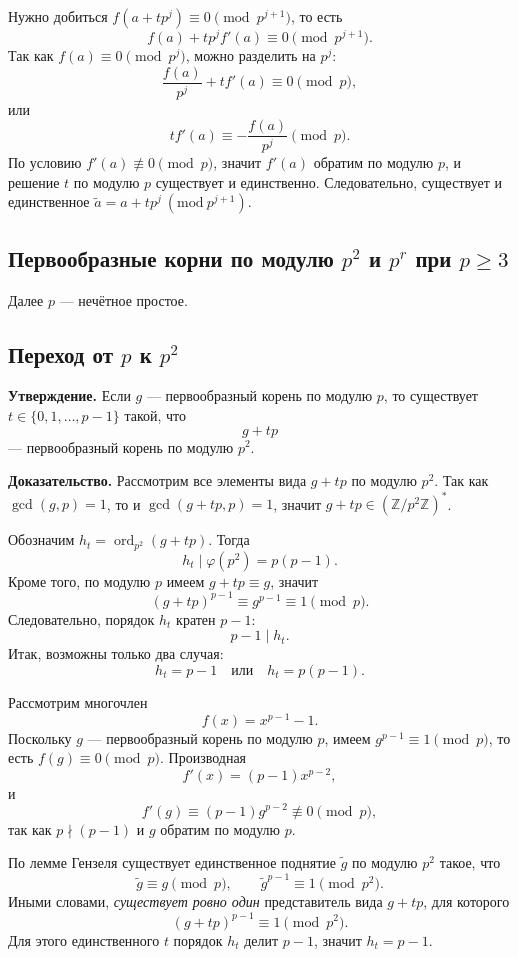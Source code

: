 \documentclass[12pt,a4paper]{article}
\newcommand{\Z}{\mathbb{Z}}
\DeclareMathOperator{\gcdop}{gcd}
\DeclareMathOperator{\ord}{ord}
\begin{document}
Нужно добиться $f(a+t p^j)\equiv 0\pmod{p^{j+1}}$, то есть
\[
f(a)+t p^j f'(a)\equiv 0\pmod{p^{j+1}}.
\]
Так как $f(a)\equiv 0\pmod{p^j}$, можно разделить на $p^j$:
\[
\frac{f(a)}{p^j}+t f'(a)\equiv 0\pmod p,
\]
или
\[
t f'(a)\equiv -\frac{f(a)}{p^j}\pmod p.
\]
По условию $f'(a)\not\equiv 0\pmod p$, значит $f'(a)$ обратим по модулю $p$, и решение $t$ по модулю $p$ существует и единственно.
Следовательно, существует и единственное $\tilde a=a+t p^j \ (\mathrm{mod}\ p^{j+1})$.

\subsection*{Первообразные корни по модулю $p^2$ и $p^r$ при $p\ge 3$}

Далее $p$ — нечётное простое.

\subsection*{Переход от $p$ к $p^2$}

\textbf{Утверждение.} Если $g$ — первообразный корень по модулю $p$, то существует $t\in\{0,1,\dots,p-1\}$ такой, что
\[
g+t p
\]
— первообразный корень по модулю $p^2$.

\textbf{Доказательство.}
Рассмотрим все элементы вида $g+t p$ по модулю $p^2$.
Так как $\gcdop(g,p)=1$, то и $\gcdop(g+t p,p)=1$, значит $g+t p\in(\Z/p^2\Z)^{\ast}$.

Обозначим $h_t=\ord_{p^2}(g+t p)$. Тогда
\[
h_t \mid \varphi(p^2)=p(p-1).
\]
Кроме того, по модулю $p$ имеем $g+t p \equiv g$, значит
\[
(g+t p)^{p-1}\equiv g^{p-1}\equiv 1\pmod p.
\]
Следовательно, порядок $h_t$ кратен $p-1$:
\[
p-1 \mid h_t.
\]
Итак, возможны только два случая:
\[
h_t=p-1 \quad\text{или}\quad h_t=p(p-1).
\]

Рассмотрим многочлен
\[
f(x)=x^{p-1}-1.
\]
Поскольку $g$ — первообразный корень по модулю $p$, имеем $g^{p-1}\equiv 1\pmod p$, то есть $f(g)\equiv 0\pmod p$.
Производная
\[
f'(x)=(p-1)x^{p-2},
\]
и
\[
f'(g)\equiv (p-1)g^{p-2}\not\equiv 0\pmod p,
\]
так как $p\nmid(p-1)$ и $g$ обратим по модулю $p$.

По лемме Гензеля существует единственное поднятие $\tilde g$ по модулю $p^2$ такое, что
\[
\tilde g\equiv g\pmod p,
\qquad
\tilde g^{p-1}\equiv 1\pmod{p^2}.
\]
Иными словами, \emph{существует ровно один} представитель вида $g+t p$, для которого
\[
(g+t p)^{p-1}\equiv 1\pmod{p^2}.
\]
Для этого единственного $t$ порядок $h_t$ делит $p-1$, значит $h_t=p-1$.
\end{document}

